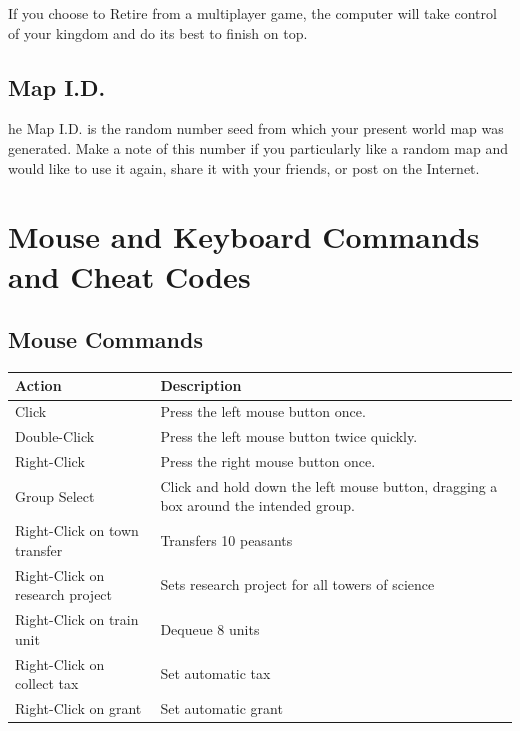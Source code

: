 If you choose to Retire from a multiplayer game, the computer will take control of your kingdom and do its best to finish on top.

\subsection{Map I.D.}


he Map I.D. is the random number seed from which your present world map was generated. Make a note of this number if you particularly like a random map and would like to use it again, share it with your friends, or post on the Internet.

\section{Mouse and Keyboard Commands and Cheat Codes}


\subsection{Mouse Commands}


\begin{center}
	\begin{tabular}{|p{2in}|p{2in}|}
		\hline
		Action	& Description \\ \hline
		Click	& Press the left mouse button once. \\ \hline
		Double-Click	& Press the left mouse button twice quickly. \\ \hline
		Right-Click	& Press the right mouse button once. \\ \hline
		Group Select	& Click and hold down the left mouse button, dragging a box around the intended group. \\ \hline
		Right-Click on town transfer	& Transfers 10 peasants \\ \hline
		Right-Click on research project	& Sets research project for all towers of science \\ \hline
		Right-Click on train unit	& Dequeue 8 units \\ \hline
		Right-Click on collect tax	& Set automatic tax \\ \hline
		Right-Click on grant	&  Set automatic grant \\
		\hline
	\end{tabular}
\end{center}

